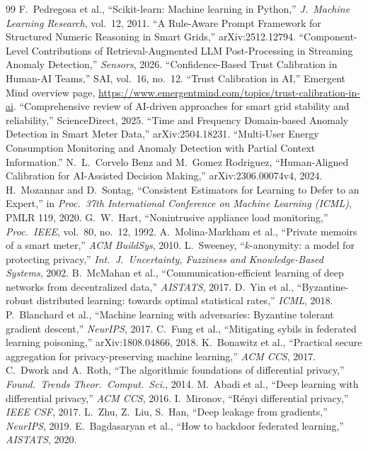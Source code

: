 \begin{thebibliography}{99}
 F.~Pedregosa et al., ``Scikit-learn: Machine learning in Python,'' \emph{J.\ Machine Learning Research}, vol.~12, 2011.
 ``A Rule-Aware Prompt Framework for Structured Numeric Reasoning in Smart Grids,'' arXiv:2512.12794.
 ``Component-Level Contributions of Retrieval-Augmented LLM Post-Processing in Streaming Anomaly Detection,'' \emph{Sensors}, 2026.
 ``Confidence-Based Trust Calibration in Human-AI Teams,'' SAI, vol.~16, no.~12.
 ``Trust Calibration in AI,'' Emergent Mind overview page, \url{https://www.emergentmind.com/topics/trust-calibration-in-ai}.
 ``Comprehensive review of AI-driven approaches for smart grid stability and reliability,'' ScienceDirect, 2025.
 ``Time and Frequency Domain-based Anomaly Detection in Smart Meter Data,'' arXiv:2504.18231.
 ``Multi-User Energy Consumption Monitoring and Anomaly Detection with Partial Context Information.''
 N.~L.~Corvelo Benz and M.~Gomez Rodriguez, ``Human-Aligned Calibration for AI-Assisted Decision
Making,'' arXiv:2306.00074v4, 2024.
 H.~Mozannar and D.~Sontag, ``Consistent Estimators for Learning to Defer to an Expert,'' in
\emph{Proc.\ 37th International Conference on Machine Learning (ICML)}, PMLR 119, 2020.
 G.~W.~Hart, ``Nonintrusive appliance load monitoring,'' \emph{Proc.\ IEEE}, vol.~80, no.~12, 1992.
 A.~Molina-Markham et al., ``Private memoirs of a smart meter,'' \emph{ACM BuildSys}, 2010.
 L.~Sweeney, ``$k$-anonymity: a model for protecting privacy,'' \emph{Int.\ J.\ Uncertainty, Fuzziness and Knowledge-Based Systems}, 2002.
 B.~McMahan et al., ``Communication-efficient learning of deep networks from decentralized data,'' \emph{AISTATS}, 2017.
 D.~Yin et al., ``Byzantine-robust distributed learning: towards optimal statistical rates,'' \emph{ICML}, 2018.
 P.~Blanchard et al., ``Machine learning with adversaries: Byzantine tolerant gradient descent,'' \emph{NeurIPS}, 2017.
 C.~Fung et al., ``Mitigating sybils in federated learning poisoning,'' arXiv:1808.04866, 2018.
 K.~Bonawitz et al., ``Practical secure aggregation for privacy-preserving machine learning,'' \emph{ACM CCS}, 2017.
 C.~Dwork and A.~Roth, ``The algorithmic foundations of differential privacy,'' \emph{Found.\ Trends Theor.\ Comput.\ Sci.}, 2014.
 M.~Abadi et al., ``Deep learning with differential privacy,'' \emph{ACM CCS}, 2016.
 I.~Mironov, ``R\'enyi differential privacy,'' \emph{IEEE CSF}, 2017.
 L.~Zhu, Z.~Liu, S.~Han, ``Deep leakage from gradients,'' \emph{NeurIPS}, 2019.
 E.~Bagdasaryan et al., ``How to backdoor federated learning,'' \emph{AISTATS}, 2020.
\end{thebibliography}

